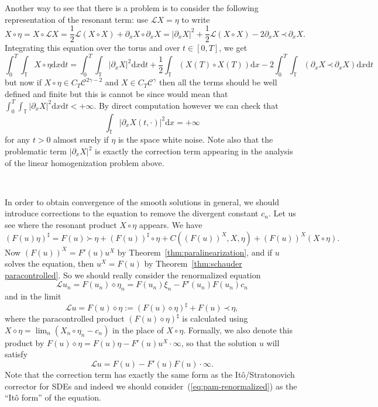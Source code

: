 \documentclass[a4paper,11pt]{article}
\newcommand{\assign}{:=}
\newcommand{\cdummy}{\cdot}
\newcommand{\mathd}{\mathrm{d}}
\newcommand{\noplus}{}
\newcommand{\LL}{\mathscr{L}}
\newcommand{\CC}{\mathscr{C}}
\newcommand{\lpara}{\,\mathord{\prec}\,}
\newcommand{\rpara}{\,\mathord{\succ}\,}
\newcommand{\reso}{\,\mathord{\circ}\,}
\newcommand{\renorm}{\,\mathord{\diamond}\,}
\begin{document}
Another way to see that there is a problem is to consider the following
representation of the resonant term: use $\LL X = \eta$ to write
\[ X \reso \eta = X \reso \LL X = \frac{1}{2} \LL (X \reso X) + \partial_x X
   \reso \partial_x X = | \partial_x X |^2 + \frac{1}{2} \LL (X \reso X) - 2
   \partial_x X \lpara \partial_x X. \]
Integrating this equation over the torus and over $t \in [0, T]$, we get
\[ \int_0^T \int_{\mathbb{T}} X \reso \eta \mathd x \mathd t = \int_0^T
   \int_{\mathbb{T}} | \partial_x X |^2 \mathd x \mathd t + \frac{1}{2}
   \int_{\mathbb{T}} (X (T) \reso X (T)) \mathd x - 2 \int_0^T
   \int_{\mathbb{T}} (\partial_x X \lpara \partial_x X) \mathd x \mathd t \]
but now if $X \reso \eta \in C_T \CC^{2 \gamma - 2}$ and $X \in C_T
\CC^{\gamma}$ then all the terms should be well defined and finite but this is
cannot be since would mean that $\int_0^T \int_{\mathbb{T}} | \partial_x X
|^2 \mathd x \mathd t < \noplus + \infty$. By direct computation however we
can check that
\[ \int_{\mathbb{T}} | \partial_x X (t, \cdot) |^2 \mathd x = \noplus +
   \infty \]
for any $t > 0$ almost surely if $\eta$ is the space white noise. Note also
that the problematic term $| \partial_x X |^2$ is exactly the correction term
appearing in the analysis of the linear homogenization problem above.

\

In order to obtain convergence of the smooth solutions in general, we should
introduce corrections to the equation to remove the divergent constant $c_n$.
Let us see where the resonant product $X \reso \eta$ appears. We have
\[  (F (u) \eta)^{\sharp} = F (u) \rpara \eta + (F (u))^{\sharp} \reso \eta + C
   ((F (u))^X, X, \eta) + (F (u))^X (X \reso \eta) . \]
Now $(F (u))^X = F' (u) u^X$ by Theorem~\ref{thm:paralinearization}, and if
$u$ solves the equation, then $u^X = F (u)$ by Theorem~\ref{thm:schauder
paracontrolled}. So we should really consider the renormalized equation
\[ \LL u_n = F (u_n) \renorm \eta_n = F (u_n) \xi_n - F' (u_n) F (u_n) c_n \]
and in the limit
\begin{equation}
  \label{eq:pam-renormalized} \LL u = F (u) \renorm \eta \assign (F (u)
  \renorm \eta)^{\sharp} + F (u) \lpara \eta,
\end{equation}
where the paracontrolled product $(F (u) \renorm \eta)^{\sharp}$ is
calculated using $X \renorm \eta = \lim_n (X_n \reso \eta_n - c_n)$ in the
place of $X \reso \eta$. Formally, we also denote this product by $F (u)
\renorm \eta = F (u) \eta - F' (u) u^X \cdummy \infty$, so that the solution
$u$ will satisfy
\[ \LL u = F (u) - F' (u) F (u) \cdot \infty . \]
Note that the correction term has exactly the same form as the
It{\^o}/Stratonovich corrector for SDEs and indeed we should
consider~(\ref{eq:pam-renormalized}) as the ``It{\^o} form'' of the equation.
\end{document}
